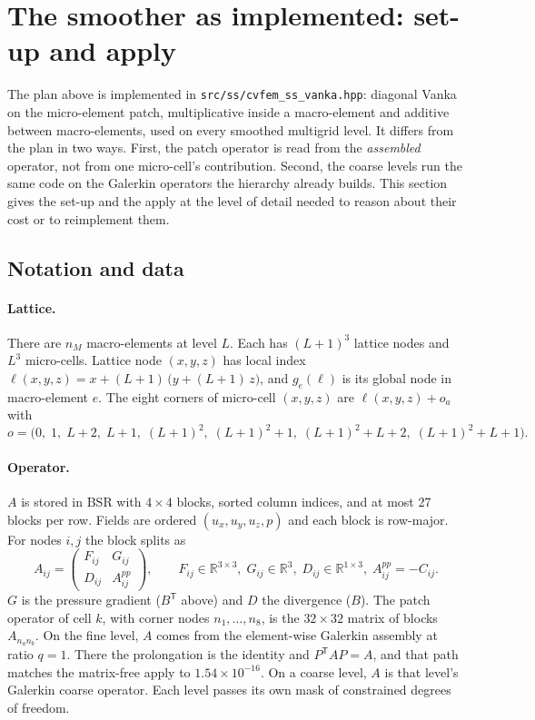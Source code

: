 \documentclass[11pt,a4paper]{article}
\newcommand{\code}[1]{\texttt{\small #1}}
\begin{document}
\section{The smoother as implemented: set-up and apply}
\label{sec:implemented}

The plan above is implemented in \code{src/ss/cvfem\_ss\_vanka.hpp}: diagonal Vanka on the
micro-element patch, multiplicative inside a macro-element and additive between
macro-elements, used on every smoothed multigrid level. It differs from the plan in two ways.
First, the patch operator is read from the \emph{assembled} operator, not from one
micro-cell's contribution. Second, the coarse levels run the same code on the Galerkin
operators the hierarchy already builds. This section gives the set-up and the apply at the
level of detail needed to reason about their cost or to reimplement them.

\subsection{Notation and data}

\paragraph{Lattice.} There are $n_M$ macro-elements at level $L$. Each has $(L+1)^3$ lattice
nodes and $L^3$ micro-cells. Lattice node $(x,y,z)$ has local index
$\ell(x,y,z) = x + (L+1)\,\big(y + (L+1)\,z\big)$, and $g_e(\ell)$ is its global node in
macro-element $e$. The eight corners of micro-cell $(x,y,z)$ are $\ell(x,y,z) + o_a$ with
\begin{equation}
o = \big(0,\; 1,\; L{+}2,\; L{+}1,\; (L{+}1)^2,\; (L{+}1)^2{+}1,\; (L{+}1)^2{+}L{+}2,\;
(L{+}1)^2{+}L{+}1\big).
\end{equation}

\paragraph{Operator.} $A$ is stored in BSR with $4\times4$ blocks, sorted column indices, and
at most 27 blocks per row. Fields are ordered $(u_x,u_y,u_z,p)$ and each block is row-major.
For nodes $i,j$ the block splits as
\begin{equation}
A_{ij} = \begin{pmatrix} F_{ij} & G_{ij} \\ D_{ij} & A^{pp}_{ij} \end{pmatrix},
\qquad F_{ij}\in\mathbb{R}^{3\times3},\; G_{ij}\in\mathbb{R}^{3},\; D_{ij}\in\mathbb{R}^{1\times3},
\; A^{pp}_{ij} = -C_{ij}.
\end{equation}
$G$ is the pressure gradient ($B^{\mathsf T}$ above) and $D$ the divergence ($B$). The patch
operator of cell $k$, with corner nodes $n_1,\dots,n_8$, is the $32\times32$ matrix of blocks
$A_{n_a n_b}$. On the fine level, $A$ comes from the element-wise Galerkin assembly at
ratio $q=1$. There the prolongation is the identity and $P^{\mathsf T}AP = A$, and that path
matches the matrix-free apply to $1.54\times10^{-16}$. On a coarse level, $A$ is that level's
Galerkin coarse operator. Each level passes its own mask of constrained degrees of freedom.
\end{document}
